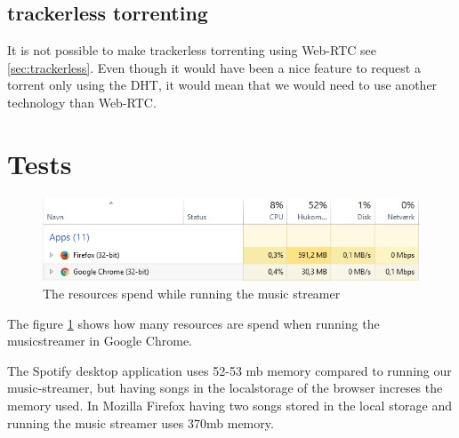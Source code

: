 \subsection{trackerless torrenting}
It is not possible to make trackerless torrenting using Web-RTC see \ref{sec:trackerless}. Even though it would have been a nice feature to request a torrent only using the \acs{DHT}, it would mean that we would need to use another technology than Web-RTC. 

\section{Tests}
\begin{figure}[H]
	\centering
	\includegraphics[scale=0.4]{gfx/streamerIdle}
	\caption{The resources spend while running the music streamer}
	\label{fig:streamer-idle}
\end{figure}
The figure \ref{fig:streamer-idle} shows how many resources are spend when running the musicstreamer in Google Chrome.

The Spotify desktop application uses 52-53 mb memory compared to running our music-streamer, but having songs in the localstorage of the browser increses the memory used. In Mozilla Firefox having two songs stored in the local storage and running the music streamer uses 370mb memory.

